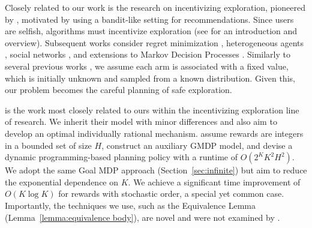 Closely related to our work is the research on incentivizing exploration, pioneered by \citet{KremerMP13}, motivated by using a bandit-like setting for recommendations. Since users are selfish, algorithms must incentivize exploration (see \cite{slivkins2019introduction} for an introduction and overview). Subsequent works consider regret minimization \cite{mansour2015bayesian,mansour2020bayesian}, heterogeneous agents \cite{chen18a,immorlica2019bayesian}, social networks \citep{Bahar2016,bahar2019recommendation}, and extensions to Markov Decision Processes \cite{simchowitz2024exploration}. Similarly to several previous works \cite{Fiduciary,BaharST19,cohen2019optimal,KremerMP13}, we assume each arm is associated with a fixed value, which is initially unknown and sampled from a known distribution. Given this, our problem becomes the careful planning of safe exploration.

\citet{Fiduciary} is the work most closely related to ours within the incentivizing exploration line of research. We inherit their model with minor differences and also aim to develop an optimal individually rational mechanism. \citet{Fiduciary} assume rewards are integers in a bounded set of size $H$, construct an auxiliary GMDP model, and devise a dynamic programming-based planning policy with a runtime of $O(2^K K^2 H^2)$. We adopt the same Goal MDP approach (Section~\ref{sec:infinite}) but aim to reduce the exponential dependence on $K$. We achieve a significant time improvement of $O(K \log K)$ for rewards with stochastic order, a special yet common case. Importantly, the techniques we use, such as the Equivalence Lemma (Lemma~\ref{lemma:equivalence body}), are novel and were not examined by \citet{Fiduciary}. 





